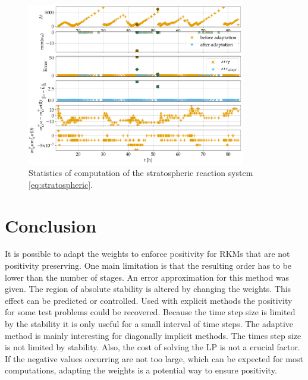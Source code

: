 \documentclass[a4paper]{article}
\numberwithin{equation}{section}
\theoremstyle{plain}
\theoremstyle{definition}
\numberwithin{theorem}{section}
\newcommand{\1}{\mathbbm{1}}
\newcommand{\todo}[1]{{\Large{\color{red}{#1}}}}
\begin{document}
\todo{TODO: Plot relative change $(m_O^T u - m_O^T u(t_0)) / m_O^T u(t_0)$
instead of the absolute change of the linear invariants?}

\begin{figure}
\centering
\includegraphics[width=0.85\textwidth]{plots/Stratospheric_stepsize,b.pdf}
\caption{Statistics of computation of the stratospheric reaction system
         \eqref{eq:stratospheric}.}
\label{fig:Stats_Strat}
\end{figure}


\section{Conclusion} \label{sec:conclusion}

It is possible to adapt the weights to enforce positivity for RKMs that are not positivity preserving.
One main limitation is that the resulting order has to be lower than the number of stages.
An error approximation for this method was given.
The region of absolute stability is altered by changing the weights. This effect can be predicted or controlled.
Used with explicit methods the positivity for some test problems could be recovered.
Because the time step size is limited by the stability it is only useful for a small interval of time steps.
The adaptive method is mainly interesting for diagonally implicit methods.
The times step size is not limited by stability.
Also, the cost of solving the LP is not a crucial factor.
If the negative values occurring are not too large, which can be expected for most computations, adapting the weights is a potential way to ensure positivity.



\printbibliography
\end{document}
